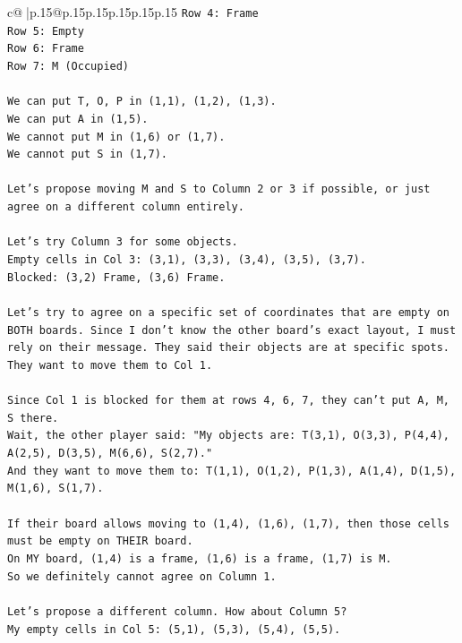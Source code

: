 \documentclass{article}
\begin{document}
{\begin{supertabular}{c@{$\;$}|p{.15\linewidth}@{}p{.15\linewidth}p{.15\linewidth}p{.15\linewidth}p{.15\linewidth}p{.15\linewidth}}
{{{\texttt{Row 4: Frame} \\
\texttt{Row 5: Empty} \\
\texttt{Row 6: Frame} \\
\texttt{Row 7: M (Occupied)} \\
\\ 
\texttt{We can put T, O, P in (1,1), (1,2), (1,3).} \\
\texttt{We can put A in (1,5).} \\
\texttt{We cannot put M in (1,6) or (1,7).} \\
\texttt{We cannot put S in (1,7).} \\
\\ 
\texttt{Let's propose moving M and S to Column 2 or 3 if possible, or just agree on a different column entirely.} \\
\\ 
\texttt{Let's try Column 3 for some objects.} \\
\texttt{Empty cells in Col 3: (3,1), (3,3), (3,4), (3,5), (3,7).} \\
\texttt{Blocked: (3,2) Frame, (3,6) Frame.} \\
\\ 
\texttt{Let's try to agree on a specific set of coordinates that are empty on BOTH boards. Since I don't know the other board's exact layout, I must rely on their message. They said their objects are at specific spots. They want to move them to Col 1.} \\
\\ 
\texttt{Since Col 1 is blocked for them at rows 4, 6, 7, they can't put A, M, S there.} \\
\texttt{Wait, the other player said: "My objects are: T(3,1), O(3,3), P(4,4), A(2,5), D(3,5), M(6,6), S(2,7)."} \\
\texttt{And they want to move them to: T(1,1), O(1,2), P(1,3), A(1,4), D(1,5), M(1,6), S(1,7).} \\
\\ 
\texttt{If their board allows moving to (1,4), (1,6), (1,7), then those cells must be empty on THEIR board.} \\
\texttt{On MY board, (1,4) is a frame, (1,6) is a frame, (1,7) is M.} \\
\texttt{So we definitely cannot agree on Column 1.} \\
\\ 
\texttt{Let's propose a different column. How about Column 5?} \\
\texttt{My empty cells in Col 5: (5,1), (5,3), (5,4), (5,5).} \\
}}}
\end{supertabular}}
\end{document}
